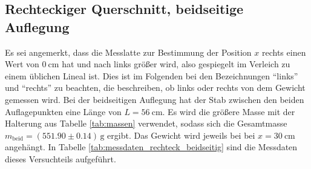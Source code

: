 \subsection{Rechteckiger Querschnitt, beidseitige Auflegung}
\label{sec:rechteck_beidseitig}
Es sei angemerkt, dass die Messlatte zur Bestimmung der Position $x$ rechts einen Wert von $\qty{0}{\cm}$ hat und nach links größer wird,
also gespiegelt im Verleich zu einem üblichen Lineal ist. 
Dies ist im Folgenden bei den Bezeichnungen \enquote{links} und \enquote{rechts} zu beachten, die beschreiben, ob links oder rechts von dem Gewicht gemessen wird.
Bei der beidseitigen Auflegung hat der Stab zwischen den beiden Auflagepunkten eine Länge von $L = \qty{56}{\cm}$.
Es wird die größere Masse mit der Halterung aus Tabelle \ref{tab:massen} verwendet, sodass sich die Gesamtmasse
$m_\text{beid} = (\num{551.90} \pm \num{0.14}) \, \unit{\gram}$ ergibt.
Das Gewicht wird jeweils bei bei $x = \qty{30}{\cm}$ angehängt.
In Tabelle \ref{tab:messdaten_rechteck_beidseitig} sind die Messdaten dieses Versuchteils aufgeführt.
